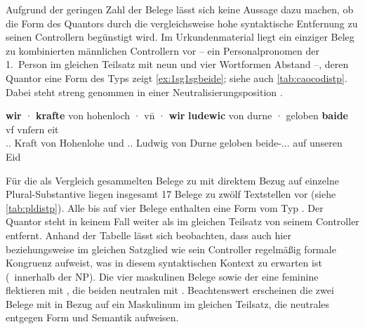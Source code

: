 Aufgrund der geringen Zahl der Belege lässt sich keine Aussage dazu machen, ob
die Form des Quantors durch die vergleichsweise hohe syntaktische Entfernung zu
seinen Controllern begünstigt wird. Im Urkundenmaterial liegt ein einziger
Beleg zu kombinierten männlichen Controllern vor -- ein Personalpronomen der
1.~Person im gleichen Teilsatz mit neun und vier Wortformen Abstand --, deren
Quantor eine Form des Typs  zeigt \cref{ex:1sg1sgbeide}; siehe auch
\cref{tab:caocodistp}. Dabei steht  streng genommen in einer
Neutralisierungsposition
\autocites[vgl.][90--91]{askedal1973}[191]{gjelsten1980}.

\begin{exe}
\ex\label{ex:1sg1sgbeide}
	\gll \textbf{wir} · \textbf{krafte} von hohenloch · vn̄ · \textbf{wir}
		\textbf{ludewic} von durne · geloben \textbf{baide} vf vnſern eit \\
		\Fsg\subM.\Hon.\Nom{} {} Kraft von Hohenlohe {} und {}
		\Fsg\subM.\Hon.\Nom{} Ludwig von Durne {} geloben
		beide-\Nom.\Pl.\MascM.\St{} auf unseren Eid \\
	\begin{taggedline}{\parencites(Burg Hohlach, Kr.~Neustadt an der Aisch-Bad Windsheim, 1296)[\pno~2529, 563.5--6]{cao3}}
	\trans {}
	\end{taggedline}
\end{exe}

Für die als Vergleich gesammelten Belege zu  mit direktem Bezug auf
einzelne Plural-Substantive liegen insgesamt 17 Belege zu zwölf Textstellen vor
(siehe \cref{tab:pldistp}). Alle bis auf vier Belege enthalten eine Form vom
Typ . Der Quantor steht in keinem Fall weiter als im gleichen
Teilsatz von seinem Controller entfernt. Anhand der Tabelle lässt sich
beobachten, dass auch hier  beziehungsweise  im
gleichen Satzglied wie sein Controller regelmäßig formale Kongruenz aufweist,
was in diesem syntaktischen Kontext zu erwarten ist (\Concord\ innerhalb der
NP). Die vier maskulinen Belege sowie der eine feminine flektieren mit
, die beiden neutralen mit . Beachtenswert erscheinen die
zwei Belege mit  in Bezug auf ein Maskulinum im gleichen Teilsatz,
die neutrales  entgegen Form und Semantik aufweisen.

